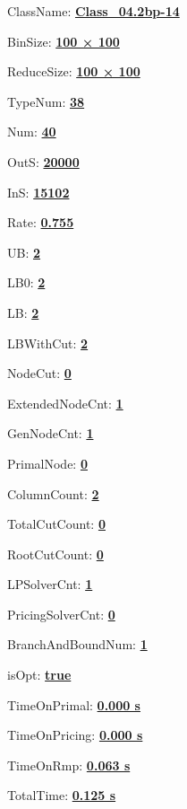 \documentclass[11pt]{article}
\begin{document}
\pagestyle{empty}


ClassName: \underline{\textbf{Class_04.2bp-14}}
\par
BinSize: \underline{\textbf{100 × 100}}
\par
ReduceSize: \underline{\textbf{100 × 100}}
\par
TypeNum: \underline{\textbf{38}}
\par
Num: \underline{\textbf{40}}
\par
OutS: \underline{\textbf{20000}}
\par
InS: \underline{\textbf{15102}}
\par
Rate: \underline{\textbf{0.755}}
\par
UB: \underline{\textbf{2}}
\par
LB0: \underline{\textbf{2}}
\par
LB: \underline{\textbf{2}}
\par
LBWithCut: \underline{\textbf{2}}
\par
NodeCut: \underline{\textbf{0}}
\par
ExtendedNodeCnt: \underline{\textbf{1}}
\par
GenNodeCnt: \underline{\textbf{1}}
\par
PrimalNode: \underline{\textbf{0}}
\par
ColumnCount: \underline{\textbf{2}}
\par
TotalCutCount: \underline{\textbf{0}}
\par
RootCutCount: \underline{\textbf{0}}
\par
LPSolverCnt: \underline{\textbf{1}}
\par
PricingSolverCnt: \underline{\textbf{0}}
\par
BranchAndBoundNum: \underline{\textbf{1}}
\par
isOpt: \underline{\textbf{true}}
\par
TimeOnPrimal: \underline{\textbf{0.000 s}}
\par
TimeOnPricing: \underline{\textbf{0.000 s}}
\par
TimeOnRmp: \underline{\textbf{0.063 s}}
\par
TotalTime: \underline{\textbf{0.125 s}}
\par
\newpage
\end{document}
